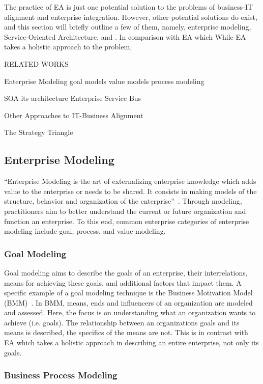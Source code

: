 The practice of EA is just one potential solution to the problems of business-IT alignment and enterprise integration. However, other potential solutions do exist, and this section will briefly outline a few of them, namely, enterprise modeling, Service-Oriented Architecture, and . In comparison with EA which While EA takes a holistic approach to the problem, 


RELATED WORKS

Enterprise Modeling
  goal models
  value models
  process modeling
  

SOA
  its architecture
  Enterprise Service Bus


Other Approaches to IT-Business Alignment
  
  The Strategy Triangle
  
\subsection{Enterprise Modeling}

``Enterprise Modeling is the art of externalizing enterprise knowledge which adds value to the enterprise or needs to be shared. It consists in making models of the structure, behavior and organization of the enterprise''~\cite{Vernadat200215}. Through modeling, practitioners aim to better understand the current or future organization and function an enterprise. To this end, common enterprise categories of enterprise modeling include goal, process, and value modeling. 

\subsubsection{Goal Modeling}

Goal modeling aims to describe the goals of an enterprise, their interrelations, means for achieving these goals, and additional factors that impact them. A specific example of a goal modeling technique is the Business Motivation Model (BMM)~\cite{bmm2010}. In BMM, means, ends and influencers of an organization are modeled and assessed. Here, the focus is on understanding what an organization wants to achieve (i.e. goals). The relationship between an organizations goals and its means is described, the specifics of the means are not. This is in contrast with EA which takes a holistic approach in describing an entire enterprise, not only its goals.

\subsubsection{Business Process Modeling}

